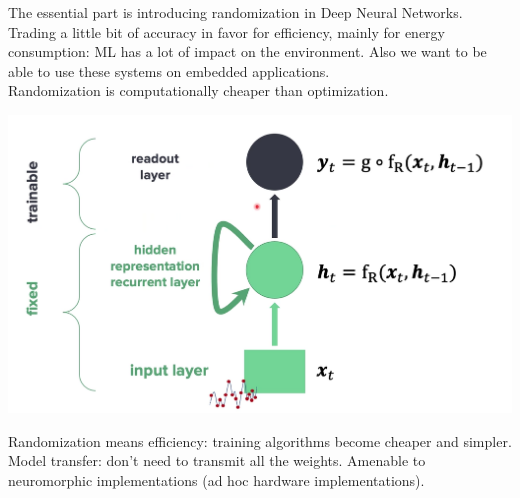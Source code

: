 \documentclass[10pt]{report}
\begin{document}
The essential part is introducing randomization in Deep Neural Networks. Trading a little bit of accuracy in favor for efficiency, mainly for energy consumption: ML has a lot of impact on the environment. Also we want to be able to use these systems on embedded applications.\\
Randomization is computationally cheaper than optimization.
\begin{center}
	\includegraphics[scale=0.5]{102.png}
\end{center}
Randomization means efficiency: training algorithms become cheaper and simpler. Model transfer: don't need to transmit all the weights. Amenable to neuromorphic implementations (ad hoc hardware implementations).
\end{document}
